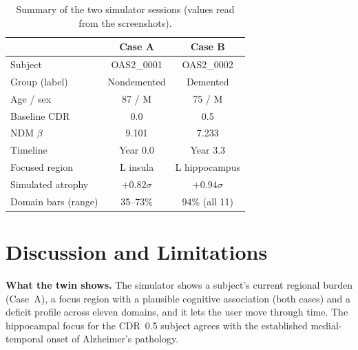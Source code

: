 \documentclass[conference]{IEEEtran}
\begin{document}
\begin{table}[t]
\caption{Summary of the two simulator sessions (values read from the screenshots).}
\label{tab:cases}
\centering
\small
\begin{tabular}{@{}lcc@{}}
\toprule
 & Case A & Case B \\
\midrule
Subject & OAS2\_0001 & OAS2\_0002 \\
Group (label) & Nondemented & Demented \\
Age / sex & 87 / M & 75 / M \\
Baseline CDR & 0.0 & 0.5 \\
NDM $\beta$ & 9.101 & 7.233 \\
Timeline & Year 0.0 & Year 3.3 \\
Focused region & L insula & L hippocampus \\
Simulated atrophy & $+0.82\sigma$ & $+0.94\sigma$ \\
Domain bars (range) & 35--73\% & 94\% (all 11) \\
\bottomrule
\end{tabular}
\end{table}

\section{Discussion and Limitations}\label{sec:limits}
\textbf{What the twin shows.} The simulator shows a subject's current regional burden (Case~A), a focus region with a plausible cognitive association (both cases) and a deficit profile across eleven domains, and it lets the user move through time. The hippocampal focus for the CDR~0.5 subject agrees with the established medial-temporal onset of Alzheimer's pathology.
\end{document}
